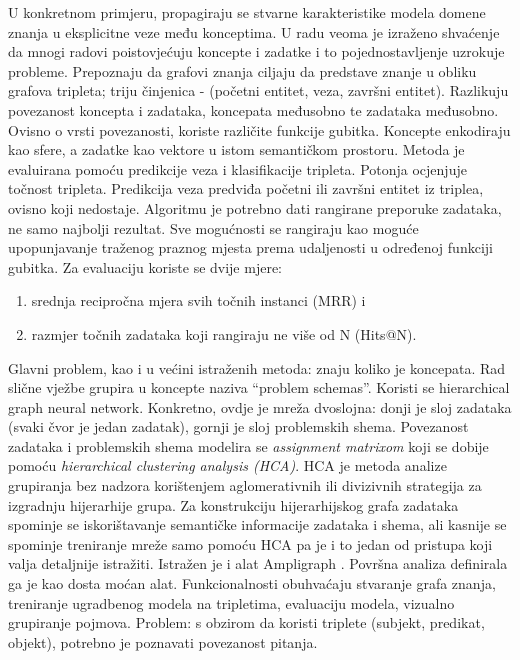 \documentclass[times, utf8,projekt]{fer}
\begin{document}
U konkretnom primjeru, propagiraju se stvarne karakteristike modela domene znanja u eksplicitne veze među konceptima.\newline
\newline
U radu \citep{15} veoma je izraženo shvaćenje da mnogi radovi poistovjećuju koncepte i zadatke i to pojednostavljenje uzrokuje probleme.\newline
Prepoznaju da grafovi znanja ciljaju da predstave znanje u obliku grafova tripleta; triju činjenica - (početni entitet, veza, završni entitet).\newline
Razlikuju povezanost koncepta i zadataka, koncepata međusobno te zadataka međusobno. Ovisno o vrsti povezanosti, koriste različite funkcije gubitka.\newline
Koncepte enkodiraju kao sfere, a zadatke kao vektore u istom semantičkom prostoru.\newline
Metoda je evaluirana pomoću predikcije veza i klasifikacije tripleta. Potonja ocjenjuje točnost tripleta.
Predikcija veza predviđa početni ili završni entitet iz triplea, ovisno koji nedostaje. Algoritmu je potrebno dati rangirane preporuke zadataka, ne samo najbolji rezultat.
Sve mogućnosti se rangiraju kao moguće upopunjavanje traženog praznog mjesta prema udaljenosti u određenoj funkciji gubitka. Za evaluaciju koriste se dvije mjere:
\begin{enumerate}
\item srednja recipročna mjera svih točnih instanci (MRR) i
\item razmjer točnih zadataka koji rangiraju ne više od N (Hits@N).
\end{enumerate}
Glavni problem, kao i u većini istraženih metoda: znaju koliko je koncepata.\newline
\newline
Rad \citep{16} slične vježbe grupira u koncepte naziva “problem schemas”. Koristi se hierarchical graph neural network. Konkretno, ovdje je mreža dvoslojna: donji je sloj zadataka (svaki čvor je jedan zadatak), gornji je sloj problemskih shema. Povezanost zadataka i problemskih shema modelira se \textit{assignment matrixom} koji se dobije pomoću \textit{hierarchical clustering analysis (HCA)}. HCA je metoda analize grupiranja bez nadzora korištenjem aglomerativnih ili divizivnih strategija za izgradnju hijerarhije grupa.
Za konstrukciju hijerarhijskog grafa zadataka spominje se iskorištavanje semantičke informacije zadataka i shema, ali kasnije se  spominje treniranje mreže samo pomoću HCA pa je i to jedan od pristupa koji valja detaljnije istražiti.\newline
\newline
Istražen je i alat Ampligraph \citep{17, 18}. Površna analiza definirala ga je kao dosta moćan alat. Funkcionalnosti obuhvaćaju stvaranje grafa znanja, treniranje ugradbenog modela na tripletima, evaluaciju modela, vizualno grupiranje pojmova.
Problem: s obzirom da koristi triplete (subjekt, predikat, objekt), potrebno je poznavati povezanost pitanja.
\end{document}
